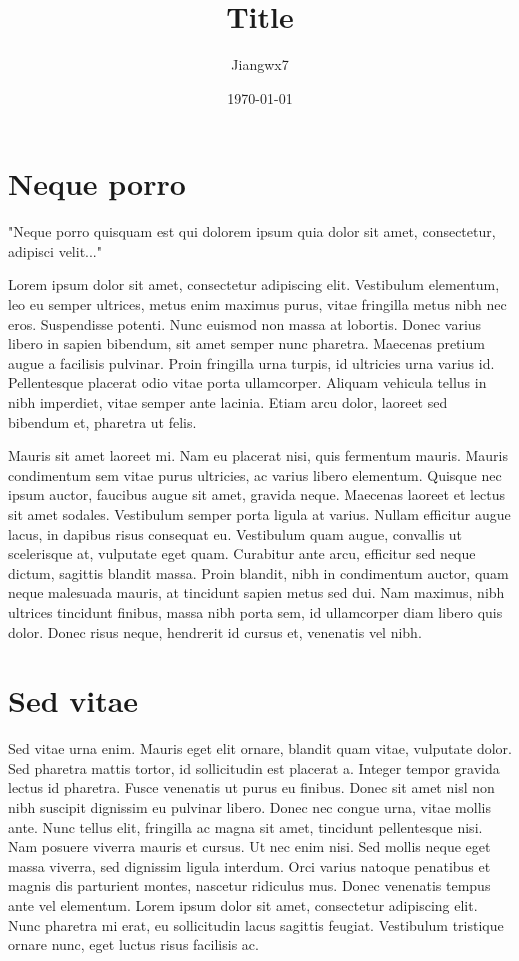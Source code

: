 \documentclass[11pt]{article}
\title{Title}
\author{Jiangwx7}
\date{\today}
\begin{document}
\maketitle
\tableofcontents
\section{Neque porro}
"Neque porro quisquam est qui dolorem ipsum quia dolor sit amet, consectetur, adipisci velit..."

Lorem ipsum dolor sit amet, consectetur adipiscing elit. Vestibulum elementum, leo eu semper ultrices, metus enim maximus purus, vitae fringilla metus nibh nec eros. Suspendisse potenti. Nunc euismod non massa at lobortis. Donec varius libero in sapien bibendum, sit amet semper nunc pharetra. Maecenas pretium augue a facilisis pulvinar. Proin fringilla urna turpis, id ultricies urna varius id. Pellentesque placerat odio vitae porta ullamcorper. Aliquam vehicula tellus in nibh imperdiet, vitae semper ante lacinia. Etiam arcu dolor, laoreet sed bibendum et, pharetra ut felis.

Mauris sit amet laoreet mi. Nam eu placerat nisi, quis fermentum mauris. Mauris condimentum sem vitae purus ultricies, ac varius libero elementum. Quisque nec ipsum auctor, faucibus augue sit amet, gravida neque. Maecenas laoreet et lectus sit amet sodales. Vestibulum semper porta ligula at varius. Nullam efficitur augue lacus, in dapibus risus consequat eu. Vestibulum quam augue, convallis ut scelerisque at, vulputate eget quam. Curabitur ante arcu, efficitur sed neque dictum, sagittis blandit massa. Proin blandit, nibh in condimentum auctor, quam neque malesuada mauris, at tincidunt sapien metus sed dui. Nam maximus, nibh ultrices tincidunt finibus, massa nibh porta sem, id ullamcorper diam libero quis dolor. Donec risus neque, hendrerit id cursus et, venenatis vel nibh.

\section{Sed vitae}
Sed vitae urna enim. Mauris eget elit ornare, blandit quam vitae, vulputate dolor. Sed pharetra mattis tortor, id sollicitudin est placerat a. Integer tempor gravida lectus id pharetra. Fusce venenatis ut purus eu finibus. Donec sit amet nisl non nibh suscipit dignissim eu pulvinar libero. Donec nec congue urna, vitae mollis ante. Nunc tellus elit, fringilla ac magna sit amet, tincidunt pellentesque nisi. Nam posuere viverra mauris et cursus. Ut nec enim nisi. Sed mollis neque eget massa viverra, sed dignissim ligula interdum. Orci varius natoque penatibus et magnis dis parturient montes, nascetur ridiculus mus. Donec venenatis tempus ante vel elementum. Lorem ipsum dolor sit amet, consectetur adipiscing elit. Nunc pharetra mi erat, eu sollicitudin lacus sagittis feugiat. Vestibulum tristique ornare nunc, eget luctus risus facilisis ac.
\end{document}
